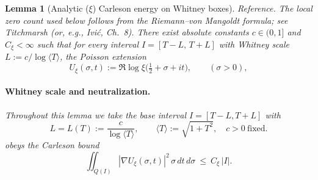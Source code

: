 \documentclass[11pt]{article}
\newtheorem{lemma}[theorem]{Lemma}
\theoremstyle{definition}
\theoremstyle{remark}
\theoremstyle{definition}
\begin{document}
\begin{lemma}[Analytic ($\xi$) Carleson energy on Whitney boxes]\label{lem:carleson-xi}
\emph{Reference.} The local zero count used below follows from the Riemann–von Mangoldt formula; see Titchmarsh \cite[Thm.~9.3]{Titchmarsh} (or, e.g., Ivi\'c, Ch.~8).
There exist absolute constants $c\in(0,1]$ and $C_\xi<\infty$ such that for every interval $I=[T-L,\,T+L]$ with Whitney scale $L:=c/\log\langle T\rangle$, the Poisson extension
\[
 U_{\xi}(\sigma,t):=\Re\log\xi\big(\tfrac12+\sigma+it\big),\qquad (\sigma>0),
\]
\paragraph{Whitney scale and neutralization.}
Throughout this lemma we take the base interval $I=[T-L,T+L]$ with
\[
  L=L(T):=\frac{c}{\log\langle T\rangle},\qquad \langle T\rangle:=\sqrt{1+T^2},\quad c>0\ \text{fixed}.
\]
obeys the Carleson bound
\[ \iint_{Q(I)} |\nabla U_{\xi}(\sigma,t)|^2\,\sigma\,dt\,d\sigma\ \le\ C_\xi\,|I|. \]
\end{lemma}
\end{document}

